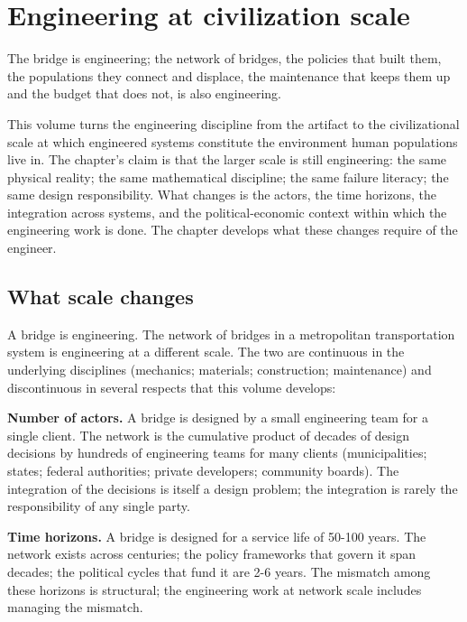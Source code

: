 \chapter{Engineering at civilization scale}
\label{vol12:ch01}

\epigraph{The bridge is engineering; the network of bridges, the policies that built them, the populations they connect and displace, the maintenance that keeps them up and the budget that does not, is also engineering.}{}


\noindent
This volume turns the engineering discipline from the artifact to the civilizational scale at which engineered systems constitute the environment human populations live in. The chapter's claim is that the larger scale is still engineering: the same physical reality; the same mathematical discipline; the same failure literacy; the same design responsibility. What changes is the actors, the time horizons, the integration across systems, and the political-economic context within which the engineering work is done. The chapter develops what these changes require of the engineer.

\section{What scale changes}

A bridge is engineering. The network of bridges in a metropolitan transportation system is engineering at a different scale. The two are continuous in the underlying disciplines (mechanics; materials; construction; maintenance) and discontinuous in several respects that this volume develops:

\textbf{Number of actors.} A bridge is designed by a small engineering team for a single client. The network is the cumulative product of decades of design decisions by hundreds of engineering teams for many clients (municipalities; states; federal authorities; private developers; community boards). The integration of the decisions is itself a design problem; the integration is rarely the responsibility of any single party.

\textbf{Time horizons.} A bridge is designed for a service life of 50-100 years. The network exists across centuries; the policy frameworks that govern it span decades; the political cycles that fund it are 2-6 years. The mismatch among these horizons is structural; the engineering work at network scale includes managing the mismatch.

